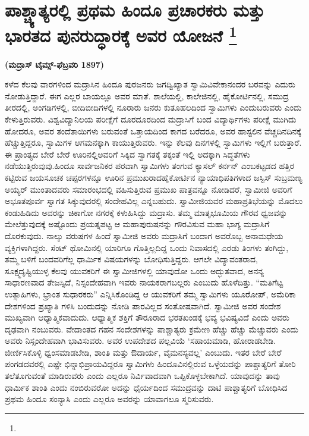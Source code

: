 
\vspace{-0.7cm}

\chapter[ಪಾಶ್ಚ್ಯಾತ್ಯರಲ್ಲಿ ಪ್ರಥಮ ಹಿಂದೂ ಪ್ರಚಾರಕರು ಮತ್ತು ಭಾರತದ ಪುನರುದ್ಧಾರಕ್ಕೆ ಅವರ ಯೋಜನೆ ]{ಪಾಶ್ಚ್ಯಾತ್ಯರಲ್ಲಿ ಪ್ರಥಮ ಹಿಂದೂ ಪ್ರಚಾರಕರು ಮತ್ತು ಭಾರತದ ಪುನರುದ್ಧಾರಕ್ಕೆ ಅವರ ಯೋಜನೆ \protect\footnote{}}

\centerline{\textbf{(ಮದ್ರಾಸ್​ ಟೈಮ್ಸ್-ಫೆಬ್ರವರಿ 1897)}}

\vskip 0.2cm

ಕಳೆದ ಕೆಲವು ವಾರಗಳಿಂದ ಮದ್ರಾಸಿನ ಹಿಂದೂ ಪುರಜನರು ಜಗದ್ವಿಖ್ಯಾತ ಸ್ವಾಮಿ\break ವಿವೇಕಾನಂದರ ಬರವನ್ನು ಎದುರು ನೋಡುತ್ತಿದ್ದಾರೆ. ಈಗ ಎಲ್ಲರ ಬಾಯಲ್ಲೂ ಅವರ ಮಾತೆ. ಶಾಲೆಯಲ್ಲಿ, ಕಾಲೇಜಿನಲ್ಲಿ, ಹೈಕೋರ್ಟಿನಲ್ಲಿ, ಸಮುದ್ರ ತೀರದಲ್ಲಿ, ಅಂಗಡಿಗಳಲ್ಲಿ, ಬೀದಿಬೀದಿಗಳಲ್ಲಿ ನೂರಾರು ಜನರು ಕುತೂಹಲದಿಂದ ಸ್ವಾಮಿಗಳು ಎಂದು\break ಬರುವರು ಎಂದು ಕೇಳುತ್ತಿರುವರು. ವಿಶ್ವವಿದ್ಯಾನಿಲಯ ಪರೀಕ್ಷೆಗೆ ದೂರದೂರದಿಂದ ಮದ್ರಾಸಿಗೆ ಬಂದ ವಿದ್ಯಾರ್ಥಿಗಳು ಪರೀಕ್ಷೆ ಮುಗಿದು ಹೋದರೂ, ಅವರ ತಂದೆ\break ತಾಯಿಗಳು ಬರುವಂತೆ ಒತ್ತಾಯದಿಂದ ಕಾಗದ ಬರೆದರೂ, ಅವರ ಹಾಸ್ಟಲಿನ ವೆಚ್ಚ\break ದಿನದಿನಕ್ಕೆ ಹೆಚ್ಚುತ್ತಿದ್ದರೂ, ಸ್ವಾಮಿಗಳ ಆಗಮನಕ್ಕಾಗಿ ಕಾಯುತ್ತಿರುವರು. ಇನ್ನು ಕೆಲವು ದಿನಗಳಲ್ಲಿ ಸ್ವಾಮಿಗಳು ಇಲ್ಲಿಗೆ ಬರುತ್ತಾರೆ. ಈ ಪ್ರಾಂತ್ಯದ ಬೇರೆ ಬೇರೆ ಊರಿನಲ್ಲಿ\break ಅವರಿಗೆ ಸಿಕ್ಕಿದ ಸ್ವಾಗತಕ್ಕೆ ತಕ್ಕಂತೆ ಇಲ್ಲಿ ಅದಕ್ಕಾಗಿ ಸಿದ್ಧತೆಗಳು ನಡೆಯುತ್ತಿರುವುವು.\break ಹಿಂದೂ ಸಾರ್ವಜನಿಕರ ಪರವಾಗಿ ಸ್ವಾಮಿಗಳು ತಂಗುವ ಕ್ಯಾಸಲ್​ ಕರ್ನನ್​ ಎಂಬ\break ಕಟ್ಟಡದ ಹತ್ತಿರ ಕಟ್ಟಿರುವ ಜಯಸೂಚಕ ಚಪ್ಪರಗಳನ್ನೂ ಊರಿನ ಪ್ರಮುಖರಾದ\break ಹೈಕೋರ್ಟಿನ ನ್ಯಾಯಾಧಿಪತಿಗಳಾದ ಜಸ್ಟಿಸ್​ ಸುಬ್ರಮಣ್ಯ ಅಯ್ಯರ್​ ಮುಂತಾದವರು ಸಮಾರಂಭದಲ್ಲಿ ವಹಿಸುತ್ತಿರುವ ಪ್ರಮುಖ ಪಾತ್ರವನ್ನೂ ನೋಡಿದರೆ, ಸ್ವಾಮೀಜಿ ಅವರಿಗೆ ಅಭೂತಪೂರ್ವ ಸ್ವಾಗತ ಸಿಕ್ಕುವುದರಲ್ಲಿ ಸಂದೇಹವಿಲ್ಲ ಎನ್ನಬಹುದು. ಸ್ವಾಮೀಜಿಯವರ ಮಹಾಪ್ರತಿಭೆಯನ್ನು ಮೊದಲು ಕಂಡುಹಿಡಿದು ಅವರನ್ನು ಚಿಕಾಗೋ ನಗರಕ್ಕೆ ಕಳುಹಿಸಿದ್ದು ಮದ್ರಾಸು. ತಮ್ಮ ಮಾತೃಭೂಮಿಯ ಗೌರವ ಧ್ವಜವನ್ನು ಮೇಲೆತ್ತುವುದಕ್ಕೆ ಅಷ್ಟೊಂದು ಪ್ರಯತ್ನಪಟ್ಟ ಆ ಮಹಾಪುರುಷನನ್ನು ಗೌರವಿಸುವ ಮಹಾ ಭಾಗ್ಯ ಮದ್ರಾಸಿಗೆ ದೊರಕುವುದು. ನಾಲ್ಕು ವರುಷಗಳ ಹಿಂದೆ ಸ್ವಾಮೀಜಿ ಅವರು ಮದ್ರಾಸಿಗೆ ಬಂದಾಗ ಅವರೊಬ್ಬ ಅನಾಮಧೇಯ ವ್ಯಕ್ತಿಗಳಾಗಿದ್ದರು. ಸೆಂಟ್​ ಥೋಮಿನಲ್ಲಿ ಯಾರಿಗೂ ಗೊತ್ತಿಲ್ಲದಿದ್ದ ಒಂದು ನಿವಾಸದಲ್ಲಿ ಎರಡು ತಿಂಗಳು ತಂಗಿದ್ದು, ತಮ್ಮ ಬಳಿಗೆ ಬಂದವರಿಗೆಲ್ಲ ಧಾರ್ಮಿಕ ವಿಷಯಗಳನ್ನು ಬೋಧಿಸುತ್ತಿದ್ದರು. ಆಗಲೇ ವಿದ್ಯಾವಂತರಾದ, ಸೂಕ್ಷ್ಮದೃಷ್ಟಿಯುಳ್ಳ ಕೆಲವು ಯುವಕರಿಗೆ ಈ ಸ್ವಾಮೀಜಿಗಳಲ್ಲಿ ಯಾವುದೋ ಒಂದು ಅದ್ಭುತವಾದ, ಅನನ್ಯ ಸಾಧಾರಣವಾದ ತೇಜಸ್ಸಿದೆ, ನಿಸ್ಸಂದೇಹವಾಗಿ ಇವರು ನಾಯಕರಾಗಬಲ್ಲರು ಎಂಬುದು ಹೊಳೆದಿತ್ತು. “ಮತಿಗೆಟ್ಟ ಉತ್ಸಾಹಿಗಳು, ಭ್ರಾಂತ ಸುಧಾರಕರು” ಎನ್ನಿಸಿಕೊಂಡಿದ್ದ ಆ ಯುವಕರಿಗೆ ತಮ್ಮ ಸ್ವಾಮಿಗಳು ಯೂರೋಪ್​, ಅಮೆರಿಕಾ ದೇಶಗಳಿಂದ ಪ್ರಖ್ಯಾತಿ ಗಳಿಸಿ ಬಂದುದನ್ನು ನೋಡಿ ಪಾರವಿಲ್ಲದ ಸಂತೋಷವಾಗಿದೆ. ಸ್ವಾಮೀಜಿ ಅವರ ಸಂದೇಶ ಮುಖ್ಯವಾಗಿ ಆಧ್ಯಾತ್ಮಿಕವಾದುದು. ಆಧ್ಯಾತ್ಮಿಕ ಶಕ್ತಿಗೆ ತೌರೂರಾದ ಭರತಖಂಡಕ್ಕೆ ಭವ್ಯ ಭವಿಷ್ಯವಿದೆ ಎಂದು ಅವರು ದೃಢವಾಗಿ ನಂಬುವರು. ವೇದಾಂತದ ಗಹನ ಸಂದೇಶಗಳನ್ನು ಪಾಶ್ಚಾತ್ಯರು ಕ್ರಮೇಣ ಹೆಚ್ಚು ಹೆಚ್ಚು ಮೆಚ್ಚುವರು ಎಂದು ಅವರು ನಿಸ್ಸಂದೇಹವಾಗಿ ಭಾವಿಸುವರು. ಅವರ ಉಪದೇಶದ ಪಲ್ಲವಿಯೆ ‘ಸಹಾಯಮಾಡಿ, ಹೋರಾಡಬೇಡಿ. ಜೀರ್ಣಿಸಿಕೊಳ್ಳಿ ಧ್ವಂಸಮಾಡಬೇಡಿ, ಶಾಂತಿ ಮತ್ತು ಔದಾರ್ಯ, ವೈಮನಸ್ಯವಲ್ಲ’ ಎಂಬುದು. ಇತರ ಬೇರೆ ಬೇರೆ ಪಂಗಡದವರಲ್ಲಿ ಎಷ್ಟೇ ಭಿನ್ನಾಭಿಪ್ರಾಯವಿದ್ದರೂ ಸ್ವಾಮಿಗಳು ಹಿಂದೂವಿನಲ್ಲಿರುವ ಒಳ್ಳೆಯದನ್ನು ಪಾಶ್ಚಾತ್ಯರಿಗೆ ತೋರಿ ತಲೆತೂಗುವಂತೆ ಮಾಡಿರುವರು ಎಂದು ಎಲ್ಲರೂ ನಿರ್ವಿವಾದವಾಗಿ ಒಪ್ಪಿಕೊಳ್ಳಬೇಕಾಗಿದೆ. ಯಾವುದನ್ನು ತಾವು ಧಾರ್ಮಿಕ ಶಾಂತಿ ಎಂದು ನಂಬಿರುವರೋ ಅದನ್ನು ಧೈರ್ಯದಿಂದ ಸಮುದ್ರವನ್ನು ದಾಟಿ ಪಾಶ್ಚಾತ್ಯರಿಗೆ ಬೋಧಿಸಿದ ಪ್ರಥಮ ಹಿಂದೂ ಸಂನ್ಯಾಸಿ ಎಂದು ಎಲ್ಲರೂ ಅವರನ್ನು ಯಾವಾಗಲೂ ಸ್ಮರಿಸುವರು.

